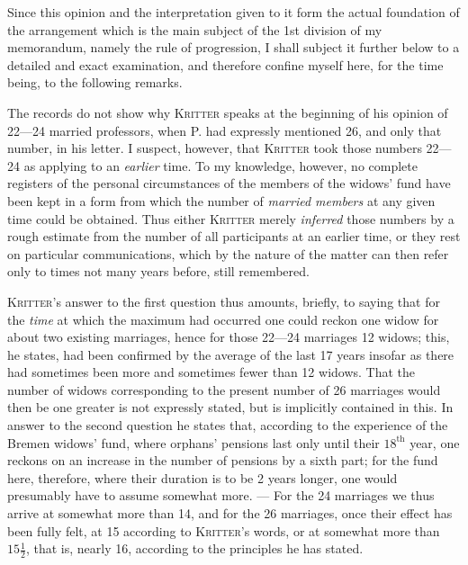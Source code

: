 \par{}
Since this opinion and the interpretation given to it form the actual foundation of the arrangement which is the main subject of the 1st division of my memorandum, namely the rule of progression, I shall subject it further below to a detailed and exact examination, and therefore confine myself here, for the time being, to the following remarks.

The records do not show why \textsc{Kritter} speaks at the beginning of his opinion of 22—24 married professors, when P. had expressly mentioned 26, and only that number, in his letter. I suspect, however, that \textsc{Kritter} took those numbers 22—24 as applying to an \textit{earlier} time. To my knowledge, however, no complete registers of the personal circumstances of the members of the widows' fund have been kept in a form from which the number of \textit{married members} at any given time could be obtained. Thus either \textsc{Kritter} merely \textit{inferred} those numbers by a rough estimate from the number of all participants at an earlier time, or they rest on particular communications, which by the nature of the matter can then refer only to times not many years before, still remembered.

\textsc{Kritter}'s answer to the first question thus amounts, briefly, to saying that for the \textit{time} at which the maximum had occurred one could reckon one widow for about two existing marriages, hence for those 22—24 marriages 12 widows; this, he states, had been confirmed by the average of the last 17 years insofar as there had sometimes been more and sometimes fewer than 12 widows. That the number of widows corresponding to the present number of 26 marriages would then be one greater is not expressly stated, but is implicitly contained in this. In answer to the second question he states that, according to the experience of the Bremen widows' fund, where orphans' pensions last only until their \(18^{\text{th}}\) year, one reckons on an increase in the number of pensions by a sixth part; for the fund here, therefore, where their duration is to be 2 years longer, one would presumably have to assume somewhat more. — For the 24 marriages we thus arrive at somewhat more than 14, and for the 26 marriages, once their effect has been fully felt, at 15 according to \textsc{Kritter}'s words, or at somewhat more than \(15\tfrac12\), that is, nearly 16, according to the principles he has stated.


